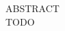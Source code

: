 \documentclass[../master.tex]{subfiles}
\begin{document}
    \vspace{.4cm}
    \begin{flushleft}
    ABSTRACT
    \vspace{.4cm}\\
    TODO
    \end{flushleft}
\end{document}
